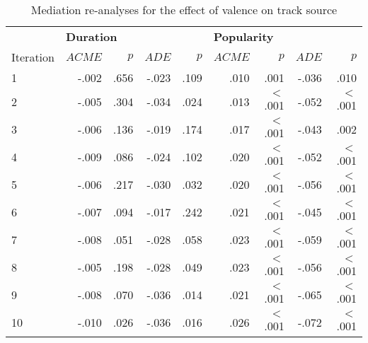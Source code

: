 \begin{table}[h]
\centering
\small

\begin{threeparttable}
\caption{Mediation re-analyses for the effect of valence on track source}
\label{tab:val-4}

\begin{tabular*}{\textwidth}{@{\extracolsep{\fill}}lrrrrrrrr@{}}

\toprule & 
\multicolumn{4}{l}{\textbf{Duration}} & \multicolumn{4}{l}{\textbf{Popularity}} \\
\cmidrule{2-9}

Iteration & $ACME$    & $p$    & $ADE$   & $p$    & $ACME$  & $p$       & $ADE$  & $p$      \\ 
\midrule

1         & -.002     & .656   & -.023   & .109   & .010    & .001      & -.036  & .010     \\
2         & -.005     & .304   & -.034   & .024   & .013    & $<$ .001  & -.052  & $<$ .001 \\
3         & -.006     & .136   & -.019   & .174   & .017    & $<$ .001  & -.043  & .002     \\
4         & -.009     & .086   & -.024   & .102   & .020    & $<$ .001  & -.052  & $<$ .001 \\
5         & -.006     & .217   & -.030   & .032   & .020    & $<$ .001  & -.056  & $<$ .001 \\
6         & -.007     & .094   & -.017   & .242   & .021    & $<$ .001  & -.045  & $<$ .001 \\
7         & -.008     & .051   & -.028   & .058   & .023    & $<$ .001  & -.059  & $<$ .001 \\
8         & -.005     & .198   & -.028   & .049   & .023    & $<$ .001  & -.056  & $<$ .001 \\
9         & -.008     & .070   & -.036   & .014   & .021    & $<$ .001  & -.065  & $<$ .001 \\
10        & -.010     & .026   & -.036   & .016   & .026    & $<$ .001  & -.072  & $<$ .001 \\ 
\bottomrule

\end{tabular*}
\end{threeparttable}
\end{table}